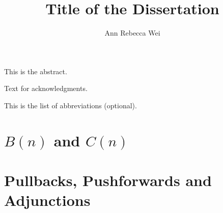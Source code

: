 \documentclass[12pt]{nuthesis}
\author{Ann Rebecca Wei}
\title{Title of the Dissertation}
\theoremstyle{definition}
\theoremstyle{remark}
\theoremstyle{example}
\begin{document}

\frontmatter		%

\maketitle		%



\abstract		%

This is the abstract.

\acknowledgements	%

Text for acknowledgments.


%
\listofabbreviations 

This is the list of abbreviations (optional).

%
%
%
%
%

\clearpage{} %
\tableofcontents	%

\clearpage{} %
\listoftables		%

\clearpage{} %
\listoffigures		%



\mainmatter             %
%
\chapter{$B(n)$ and $C(n)$}
	
	
	
%
\chapter{Pullbacks, Pushforwards and Adjunctions}
	
	
	
	
	
	
%
\end{document}
